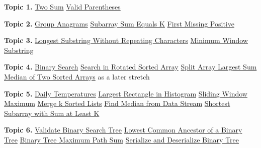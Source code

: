 \documentclass[11pt,letterpaper]{article}
\begin{document}
\textbf{Topic 1.} \href{https://leetcode.com/problems/two-sum/}{Two Sum} \textperiodcentered{} \href{https://leetcode.com/problems/valid-parentheses/}{Valid Parentheses}

\textbf{Topic 2.} \href{https://leetcode.com/problems/group-anagrams/}{Group Anagrams} \textperiodcentered{} \href{https://leetcode.com/problems/subarray-sum-equals-k/}{Subarray Sum Equals K} \textperiodcentered{} \href{https://leetcode.com/problems/first-missing-positive/}{First Missing Positive}

\textbf{Topic 3.} \href{https://leetcode.com/problems/longest-substring-without-repeating-characters/}{Longest Substring Without Repeating Characters} \textperiodcentered{} \href{https://leetcode.com/problems/minimum-window-substring/}{Minimum Window Substring}

\textbf{Topic 4.} \href{https://leetcode.com/problems/binary-search/}{Binary Search} \textperiodcentered{} \href{https://leetcode.com/problems/search-in-rotated-sorted-array/}{Search in Rotated Sorted Array} \textperiodcentered{} \href{https://leetcode.com/problems/split-array-largest-sum/}{Split Array Largest Sum} \textperiodcentered{} \href{https://leetcode.com/problems/median-of-two-sorted-arrays/}{Median of Two Sorted Arrays} as a later stretch

\textbf{Topic 5.} \href{https://leetcode.com/problems/daily-temperatures/}{Daily Temperatures} \textperiodcentered{} \href{https://leetcode.com/problems/largest-rectangle-in-histogram/}{Largest Rectangle in Histogram} \textperiodcentered{} \href{https://leetcode.com/problems/sliding-window-maximum/}{Sliding Window Maximum} \textperiodcentered{} \href{https://leetcode.com/problems/merge-k-sorted-lists/}{Merge k Sorted Lists} \textperiodcentered{} \href{https://leetcode.com/problems/find-median-from-data-stream/}{Find Median from Data Stream} \textperiodcentered{} \href{https://leetcode.com/problems/shortest-subarray-with-sum-at-least-k/}{Shortest Subarray with Sum at Least K}

\textbf{Topic 6.} \href{https://leetcode.com/problems/validate-binary-search-tree/}{Validate Binary Search Tree} \textperiodcentered{} \href{https://leetcode.com/problems/lowest-common-ancestor-of-a-binary-tree/}{Lowest Common Ancestor of a Binary Tree} \textperiodcentered{} \href{https://leetcode.com/problems/binary-tree-maximum-path-sum/}{Binary Tree Maximum Path Sum} \textperiodcentered{} \href{https://leetcode.com/problems/serialize-and-deserialize-binary-tree/}{Serialize and Deserialize Binary Tree}
\end{document}
